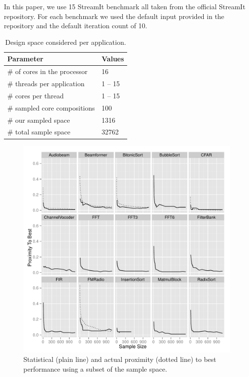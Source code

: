In this paper, we use 15 StreamIt benchmark  all taken from the official StreamIt repository.
For each benchmark we used the default input provided in the repository and the default iteration count of 10. 
\begin{table}
\centering
\begin{tabular} { p{5.2cm}  p{1.8cm} }
      \toprule
      \textbf{Parameter} & \textbf{Values} \\ \midrule
      \# of cores in the processor & 16 \\
      \# threads per application & 1 -- 15 \\
      \# cores per thread & 1 -- 15 \\ \midrule
      \# sampled core compositions & 100 \\ 
      \# our sampled space & 1316 \\
      \# total sample space & 32762 \\ \bottomrule
    \end{tabular}
  \caption{Design space considered per application.}
  \label{tab:space}
\end{table}

\begin{figure}[t]
  \centering
    \includegraphics[width=1\textwidth]{streamit-paper/graphics/ESCProx.pdf}
    \caption{Statistical (plain line) and actual proximity (dotted line) to best performance using a subset of the sample space.}\label{fig:prox}
\end{figure}

